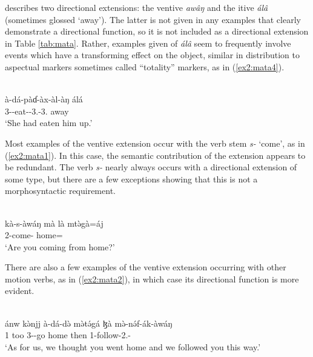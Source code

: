 \citet{dougopheGrammarMatal2021} describes two directional extensions: the ventive \textit{awâŋ} and the itive \textit{álâ} (sometimes glossed `away'). The latter is not given in any examples that clearly demonstrate a directional function, so it is not included as a directional extension in Table \ref{tab:mata}. Rather, examples given of \textit{álâ} seem to frequently involve events which have a transforming effect on the object, similar in distribution to aspectual markers sometimes called ``totality'' markers, as in (\ref{ex2:mata4}).

\ea\label{ex2:mata4}
 \\
\gll à-dá-pàɗ-àx-àl-àŋ álá	\\
3--eat--3.-3. away \\
\glt `She had eaten him up.'
\z 

Most examples of the ventive extension occur with the verb stem \textit{s-} `come', as in (\ref{ex2:mata1}). In this case, the semantic contribution of the extension appears to be redundant. The verb \textit{s-} nearly always occurs with a directional extension of some type, but there are a few exceptions showing that this is not a morphosyntactic requirement. 

\ea\label{ex2:mata1}
 \\
\gll  kà-s-àwáŋ mà là mtə̀gà=áj \\
2-come-   home= \\
\glt `Are you coming from home?'
\z 

There are also a few examples of the ventive extension occurring with other motion verbs, as in (\ref{ex2:mata2}), in which case its directional function is more evident. 

\ea\label{ex2:mata2}
 \\
\gll ánw kə̀njj à-dá-də̀ mə̀tə́gá ɮà mə̀-nə́f-ák-àwáŋ 	\\
1 too 3--go home then 1-follow-2.-		\\
\glt `As for us, we thought you went home and we followed you this way.'
\z 


